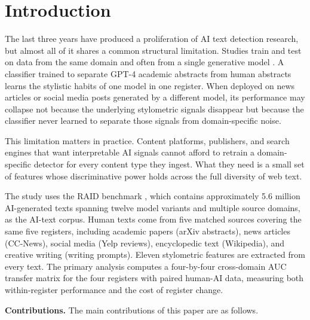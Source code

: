 \documentclass{article}
\begin{document}
\section{Introduction}

The last three years have produced a proliferation of AI text detection research, but almost all of it shares a common structural limitation. Studies train and test on data from the same domain and often from a single generative model \cite{ref1,ref2,ref3}. A classifier trained to separate GPT-4 academic abstracts from human abstracts learns the stylistic habits of one model in one register. When deployed on news articles or social media posts generated by a different model, its performance may collapse not because the underlying stylometric signals disappear but because the classifier never learned to separate those signals from domain-specific noise.

This limitation matters in practice. Content platforms, publishers, and search engines that want interpretable AI signals cannot afford to retrain a domain-specific detector for every content type they ingest. What they need is a small set of features whose discriminative power holds across the full diversity of web text.

The study uses the RAID benchmark \cite{ref4}, which contains approximately 5.6 million AI-generated texts spanning twelve model variants and multiple source domains, as the AI-text corpus. Human texts come from five matched sources covering the same five registers, including academic papers (arXiv abstracts), news articles (CC-News), social media (Yelp reviews), encyclopedic text (Wikipedia), and creative writing (writing prompts). Eleven stylometric features are extracted from every text. The primary analysis computes a four-by-four cross-domain AUC transfer matrix for the four registers with paired human-AI data, measuring both within-register performance and the cost of register change.

\textbf{Contributions.} The main contributions of this paper are as follows.
\end{document}
